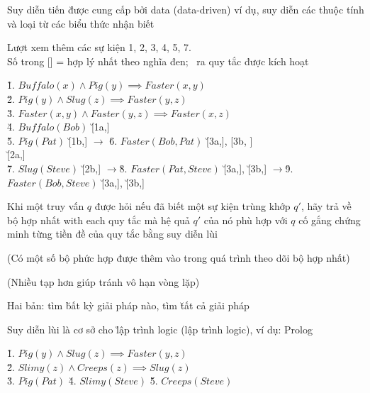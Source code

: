 \documentclass[fleqn]{article}
\begin{document}
\begin{huge}
Suy diễn tiến \u{được cung cấp bởi data (data-driven)}\nl
ví dụ, suy diễn các thuộc tính và loại từ các biểu thức nhận biết



Lượt xem thêm các sự kiện 1, 2, 3, 4, 5, 7.\\
Số trong [] = hợp lý nhất theo nghĩa đen; \tick\ ra quy tắc được kích hoạt

\u{1.} $Buffalo(x) \land Pig(y) \implies Faster(x,y)$\\
\u{2.} $Pig(y) \land Slug(z) \implies Faster(y,z)$\\
\u{3.} $Faster(x,y) \land Faster(y,z) \implies Faster(x,z)$\\
\u{4.} $Buffalo(Bob)$ \u{[1a,\cross]}\\
\u{5.} $Pig(Pat)$ \u{[1b,\cross]} $\rightarrow$ \u{6.} $Faster(Bob,Pat)$ \u{[3a,\cross]}, \u{ [3b, \cross] } \\
 \u{[2a,\cross]}\\
\u{7.} $Slug(Steve)$ \u{[2b,\cross]}\al
$\rightarrow$\u{8.} $Faster(Pat,Steve)$ \u{[3a,\cross]}, \u{[3b,\cross]}\nl
$\rightarrow$\u{9.} $Faster(Bob,Steve)$ \u{[3a,\cross]}, \u{[3b,\cross]}



Khi một truy vấn $q$ được hỏi\al
   nếu đã biết một sự kiện trùng khớp $q'$, hãy trả về bộ hợp nhất \al
   with each quy tắc mà hệ quả $q'$ của nó phù hợp với $q$\nl
      cố gắng chứng minh từng tiền đề của quy tắc bằng suy diễn lùi

(Có một số bộ phức hợp được thêm vào trong quá trình theo dõi bộ hợp nhất)

(Nhiều tạp hơn giúp tránh vô hạn vòng lặp)

Hai bản: tìm \u{bất kỳ } giải pháp nào, tìm \u{tất cả} giải pháp

Suy diễn lùi là cơ sở cho \u{lập trình logic (lập trình logic)}, ví dụ: Prolog



\u{1.} $Pig(y) \land Slug(z) \implies Faster(y,z)$\\
\u{2.} $Slimy(z) \land Creeps(z) \implies Slug(z)$\\
\u{3.} $Pig(Pat)$ \qquad \u{4.} $Slimy(Steve)$ \qquad \u{5.} $Creeps(Steve)$

\vspace*{0.4in}

\textwidth
{}




\end{huge} 
\end{document}

